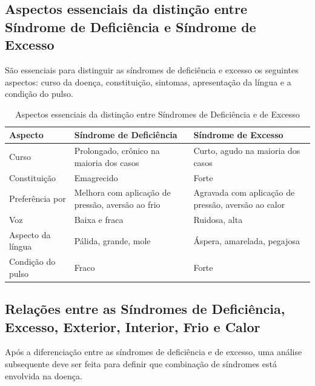 \documentclass[12pt,oneside,a4paper]{book} %
\begin{document}
\subsection{ Aspectos essenciais da distinção entre Síndrome de Deficiência e Síndrome de Excesso}
São essenciais para distinguir as síndromes de deficiência e excesso os seguintes aspectos: curso da doença, constituição, sintomas, apresentação da língua e a condição do pulso. 


\begin{table}[ht]
	
	\centering
	{\renewcommand\arraystretch{1.25}
		\caption{Aspectos essenciais da distinção entre Síndromes de Deficiência e de Excesso}}
	
		\begin{tabular}{l p{5.5cm} p{5.5cm}}
			
			\hline
			
			Aspecto &  
			Síndrome de Deficiência &
			Síndrome de Excesso				
			\\ \hline \hline
			  
			Curso &
			Prolongado, crônico na maioria dos casos &
			Curto, agudo na maioria dos casos
			\\  
			  
			Constituição &
			Emagrecido &
			Forte
			\\  
			  
			Preferência por &
			Melhora com aplicação de pressão, aversão ao frio &
			Agravada com aplicação de pressão, aversão ao calor
			\\  
			  
			Voz &
			Baixa e fraca &
			Ruidosa, alta
			\\  
			  
			Aspecto da língua &
			Pálida, grande, mole &
			Áspera, amarelada, pegajosa
			\\  
			  
			Condição do pulso &
			Fraco &
			Forte
			\\  
			\hline
			
	\end{tabular} 
	
	
\end{table} 


\subsection{Relações entre as Síndromes de Deficiência, Excesso, Exterior, Interior, Frio e Calor}
Após a diferenciação entre as síndromes de deficiência e de excesso, uma análise subsequente deve ser feita para definir que combinação de síndromes está envolvida na doença.
\end{document}
